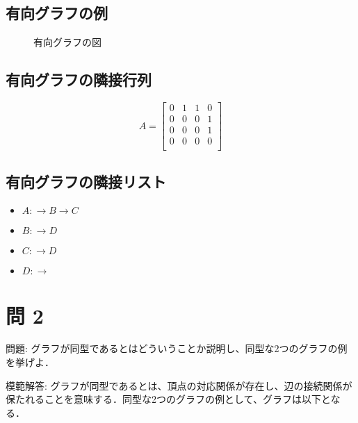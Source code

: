 \documentclass[dvipdfmx]{jlreq}
\begin{document}
\subsection*{有向グラフの例}
\begin{figure}
\begin{centering}
\caption{有向グラフの図}
\end{centering}
\end{figure}

\subsection*{有向グラフの隣接行列}
\[
A = \begin{bmatrix}
0 & 1 & 1 & 0 \\
0 & 0 & 0 & 1 \\
0 & 0 & 0 & 1 \\
0 & 0 & 0 & 0 \\
\end{bmatrix}
\]

\subsection*{有向グラフの隣接リスト}
\begin{itemize}
    \item $ A: \rightarrow B \rightarrow C $
    \item $ B:\rightarrow D $
    \item $ C:\rightarrow D $
    \item $ D: \rightarrow $
\end{itemize}

\section*{問 2}
問題: グラフが同型であるとはどういうことか説明し、同型な2つのグラフの例を挙げよ．

模範解答:
グラフが同型であるとは、頂点の対応関係が存在し、辺の接続関係が保たれることを意味する．同型な2つのグラフの例として、グラフは以下となる．
\end{document}
